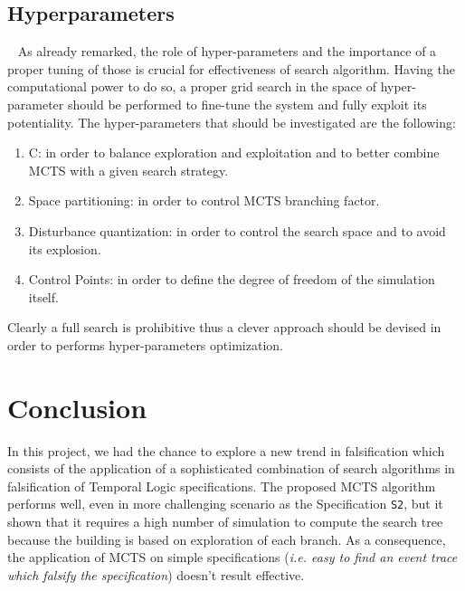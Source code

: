 \documentclass[11pt]{article}
\begin{document}
\subsection{Hyperparameters}~\label{sec:hp}
As already remarked, the role of hyper-parameters and the importance of a proper tuning of those is crucial for effectiveness of search algorithm.
Having the computational power to do so, a proper grid search in the space of hyper-parameter should be performed to fine-tune the system and fully exploit its potentiality.
The hyper-parameters that should be investigated are the following:
\begin{enumerate}
    \item C: in order to balance exploration and exploitation and to better combine MCTS with a given search strategy.
    \item Space partitioning: in order to control MCTS branching factor.
    \item Disturbance quantization: in order to control the search space and to avoid its explosion.
    \item Control Points: in order to define the degree of freedom of the simulation itself.
\end{enumerate}
Clearly a full search is prohibitive thus a clever approach should be devised in order to performs hyper-parameters optimization.

\section{Conclusion}
In this project, we had the chance to explore a new trend in falsification which consists of the application of a sophisticated combination of search algorithms in falsification of Temporal Logic specifications. The proposed MCTS algorithm performs well, even in more challenging scenario as the Specification \texttt{S2}, but it shown that it requires a high number of simulation to compute the search tree because the building is based on exploration of each branch. As a consequence, the application of MCTS on simple specifications (\textit{i.e. easy to find an event trace which falsify the specification}) doesn't result effective.
\end{document}
